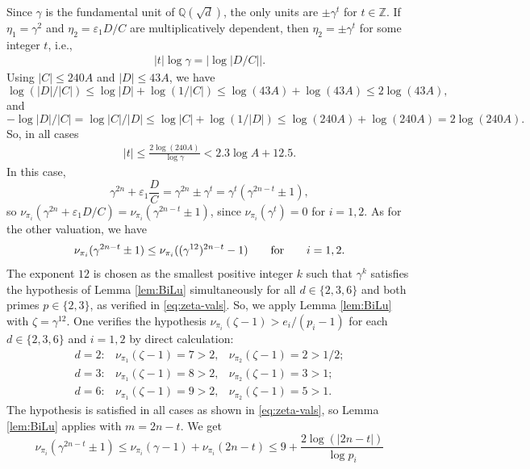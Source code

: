 \documentclass[11pt,a4paper]{article}
\numberwithin{equation}{section}
\numberwithin{table}{section}
\numberwithin{figure}{section}
\begin{document}
{Since $\gamma$ is the fundamental unit of $\mathbb{Q}(\sqrt{d})$, the only units are $\pm\gamma^t$ for $t \in \mathbb{Z}$. If $\eta_1 = \gamma^2$ and $\eta_2 = \varepsilon_1 D/C$ are multiplicatively dependent, then
$\eta_2 = \pm\gamma^t$ for some integer $t$, i.e.,
\begin{align*}
	|t|\log\gamma = |\log|D/C||.
\end{align*}
Using $|C| \leq 240A$ and $|D| \leq 43A$, we have 
$$
\log (|D|/|C|)\le \log |D|+\log(1/|C|)\le \log(43A)+\log(43A)\le 2\log(43A),
$$
and
$$
-\log|D|/|C|=\log|C|/|D|\le \log |C|+\log(1/|D|)\le \log(240A)+\log(240A)=2\log (240A).
$$
So, in all cases 
\begin{align*}
	|t| \leq \frac{2\log(240A)}{\log\gamma} < 2.3\log A + 12.5.
\end{align*}
In this case,
\begin{equation*}
	\gamma^{2n} + \varepsilon_1\frac{D}{C}
	= \gamma^{2n} \pm \gamma^t
	= \gamma^t\!\left(\gamma^{2n-t} \pm 1\right),
\end{equation*}
so $\nu_{\pi_i}(\gamma^{2n} + \varepsilon_1 D/C) = \nu_{\pi_i}(\gamma^{2n-t}\pm 1)$, since $\nu_{\pi_i}(\gamma^t) = 0$ for $i=1,2$. As for the other valuation, we have 
$$
\nu_{\pi_i}(\gamma^{2n-t}\pm 1)\le \nu_{\pi_i}((\gamma^{12})^{2n-t}-1)\qquad {\text{\rm for}}\qquad i=1,2.
$$
The exponent $12$ is chosen as the smallest positive integer $k$ such that $\gamma^k$ satisfies the hypothesis of Lemma \ref{lem:BiLu} simultaneously for all $d\in\{2,3,6\}$ and both primes $p\in\{2,3\}$, as verified in \eqref{eq:zeta-vals}. So, we apply Lemma \ref{lem:BiLu} with $\zeta = \gamma^{12}$. One verifies the hypothesis $\nu_{\pi_i}(\zeta-1) > e_i/(p_i-1)$ for each $d \in \{2,3,6\}$ and $i=1,2$ by direct calculation:
\begin{equation}\label{eq:zeta-vals}
	\begin{array}{lll}
		d=2: & \nu_{\pi_1}(\zeta-1) = 7 > 2, & \nu_{\pi_2}(\zeta-1) = 2 > 1/2; \\[4pt]
		d=3: & \nu_{\pi_1}(\zeta-1) = 8 > 2, & \nu_{\pi_2}(\zeta-1) = 3 > 1; \\[4pt]
		d=6: & \nu_{\pi_1}(\zeta-1) = 9 > 2, & \nu_{\pi_2}(\zeta-1) = 5 > 1.
	\end{array}
\end{equation}
The hypothesis is satisfied in all cases as shown in \eqref{eq:zeta-vals}, so Lemma \ref{lem:BiLu} applies with $m = 2n-t$. We get
\begin{equation*}
	\nu_{\pi_i}(\gamma^{2n-t}\pm 1)
	\leq \nu_{\pi_i}(\gamma-1) + \nu_{\pi_i}(2n-t)\le 9+\frac{2\log(|2n-t|)}{\log p_i}

\end{equation*}}
\end{document}

